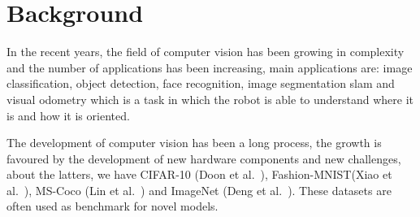 
\section{Background}\label{sec:background}

In the recent years, the field of computer vision has been growing in complexity and the number of applications has been increasing, main applications are: image classification, object detection, face recognition, image segmentation \gls{slam} and visual odometry which is a task in which the robot is able to understand where it is and how it is oriented.

The development of computer vision has been a long process, the growth is favoured by the development of new hardware components and new challenges, about the latters, we have
CIFAR-10 (Doon et al.~\cite{cifar10_paper}), Fashion-MNIST(Xiao et al.~\cite{fashion_mnist_paper}), MS-Coco (Lin et al.~\cite{ms_coco_paper}) and ImageNet (Deng et al.~\cite{imagenet_paper}).
These datasets are often used as benchmark for novel models.

